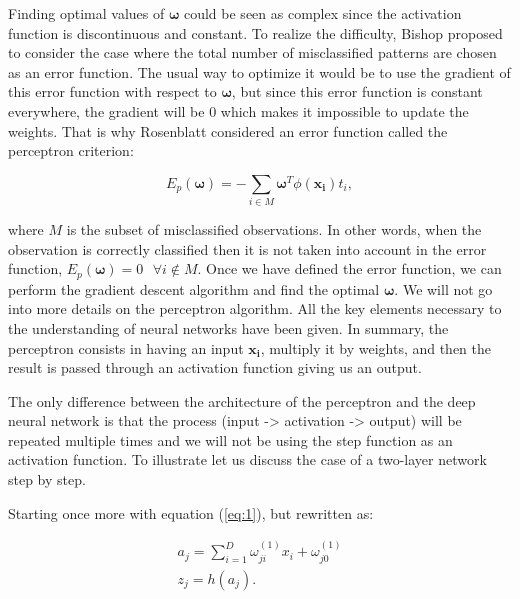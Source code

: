 \documentclass[a4paper,12pt]{article}
\numberwithin{equation}{section}
\begin{document}
Finding optimal values of $\boldsymbol{\omega}$ could be seen as complex since the activation function is discontinuous and constant. To realize the difficulty, Bishop proposed to consider the case where the total number of misclassified patterns are chosen as an error function. The usual way to optimize it would be to use the gradient of this error function with respect to $\boldsymbol{\omega}$, but since this error function is constant everywhere, the gradient will be 0 which makes it impossible to update the weights. That is why Rosenblatt considered an error function called the perceptron criterion:

\begin{equation}\label{eq:4}
E_p(\boldsymbol{\omega}) = - \sum_{i \in M}\boldsymbol{\omega}^T\phi(\boldsymbol{x_i})t_i,
\end{equation}

\noindent
where $M$ is the subset of misclassified observations. In other words, when the observation is correctly classified then it is not taken into account in the error function, $E_p(\boldsymbol{\omega}) = 0 \mbox{ }\forall i \notin M$. Once we have defined the error function, we can perform the gradient descent algorithm and find the optimal $\boldsymbol{\omega}$. We will not go into more details on the perceptron algorithm. All the key elements necessary to the understanding of neural networks have been given. In summary, the perceptron consists in having an input $\boldsymbol{x_i}$, multiply it by weights, and then the result is passed through an activation function giving us an output.

The only difference between the architecture of the perceptron and the deep neural network is that the process (input -> activation -> output) will be repeated multiple times and we will not be using the step function as an activation function. To illustrate let us discuss the case of a two-layer network step by step.

Starting once more with equation (\ref{eq:1}), but rewritten as:

\begin{align*}
  a_j = \sum_{i=1}^{D}\omega_{ji}^{(1)}x_i + \omega_{j0}^{(1)} \\
  z_j = h(a_j). \\
\end{align*}
\end{document}
